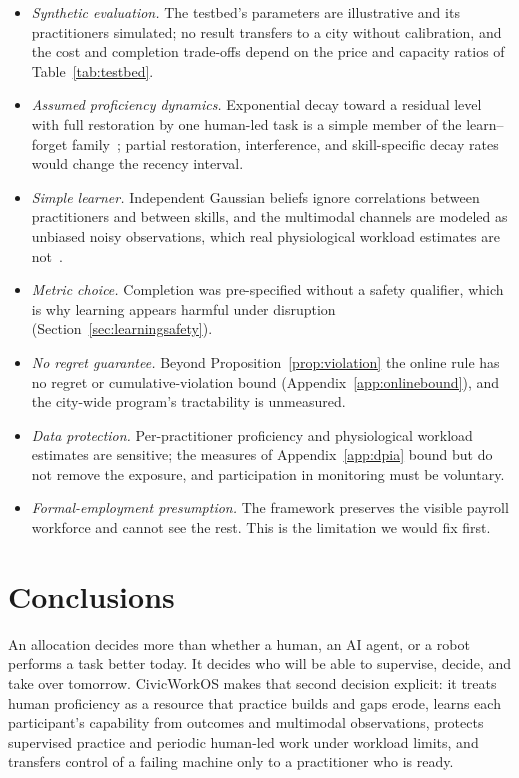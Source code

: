 \documentclass[utf8]{FrontiersinHarvard}
\begin{document}
	\begin{itemize}
		\item \textit{Synthetic evaluation.} The testbed's parameters are illustrative and its practitioners simulated; no result transfers to a city without calibration, and the cost and completion trade-offs depend on the price and capacity ratios of Table~\ref{tab:testbed}.
		\item \textit{Assumed proficiency dynamics.} Exponential decay toward a residual level with full restoration by one human-led task is a simple member of the learn--forget family~\citep{JaberBonney1996}; partial restoration, interference, and skill-specific decay rates~\citep{Arthur1998} would change the recency interval.
		\item \textit{Simple learner.} Independent Gaussian beliefs ignore correlations between practitioners and between skills, and the multimodal channels are modeled as unbiased noisy observations, which real physiological workload estimates are not~\citep{Dehais2020}.
		\item \textit{Metric choice.} Completion was pre-specified without a safety qualifier, which is why learning appears harmful under disruption (Section~\ref{sec:learningsafety}).
		\item \textit{No regret guarantee.} Beyond Proposition~\ref{prop:violation} the online rule has no regret or cumulative-violation bound (Appendix~\ref{app:onlinebound}), and the city-wide program's tractability is unmeasured.
		\item \textit{Data protection.} Per-practitioner proficiency and physiological workload estimates are sensitive; the measures of Appendix~\ref{app:dpia} bound but do not remove the exposure, and participation in monitoring must be voluntary.
		\item \textit{Formal-employment presumption.} The framework preserves the visible payroll workforce and cannot see the rest. This is the limitation we would fix first.
	\end{itemize}

	\section{Conclusions}
	\label{sec:conclusion}

	An allocation decides more than whether a human, an AI agent, or a robot performs a task better today. It decides who will be able to supervise, decide, and take over tomorrow. CivicWorkOS makes that second decision explicit: it treats human proficiency as a resource that practice builds and gaps erode, learns each participant's capability from outcomes and multimodal observations, protects supervised practice and periodic human-led work under workload limits, and transfers control of a failing machine only to a practitioner who is ready.
\end{document}
